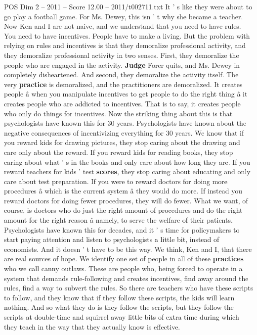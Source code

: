\begin{textsample}{POS Dim 2 – 2011 – Score 12.00 – 2011/t002711.txt}
It ' s like they were about to go play a football game.
For Ms.
Dewey, this isn ' t why she became a teacher.
Now Ken and I are not naive, and we understand that you need to have rules.
You need to have incentives.
People have to make a living.
But the problem with relying on rules and incentives is that they demoralize professional activity, and they demoralize professional activity in two senses.
First, they demoralize the people who are engaged in the activity. \textbf{Judge} Forer quits, and Ms.
Dewey in completely disheartened.
And second, they demoralize the activity itself.
The very \textbf{practice} is demoralized, and the practitioners are demoralized.
It creates people â when you manipulate incentives to get people to do the right thing â it creates people who are addicted to incentives.
That is to say, it creates people who only do things for incentives.
Now the striking thing about this is that psychologists have known this for 30 years.
Psychologists have known about the negative consequences of incentivizing everything for 30 years.
We know that if you reward kids for drawing pictures, they stop caring about the drawing and care only about the reward.
If you reward kids for reading books, they stop caring about what ' s in the books and only care about how long they are.
If you reward teachers for kids ' test \textbf{scores}, they stop caring about educating and only care about test preparation.
If you were to reward doctors for doing more procedures â which is the current system â they would do more.
If instead you reward doctors for doing fewer procedures, they will do fewer.
What we want, of course, is doctors who do just the right amount of procedures and do the right amount for the right reason â namely, to serve the welfare of their patients.
Psychologists have known this for decades, and it ' s time for policymakers to start paying attention and listen to psychologists a little bit, instead of economists.
And it doesn ' t have to be this way.
We think, Ken and I, that there are real sources of hope.
We identify one set of people in all of these \textbf{practices} who we call canny outlaws.
These are people who, being forced to operate in a system that demands rule-following and creates incentives, find away around the rules, find a way to subvert the rules.
So there are teachers who have these scripts to follow, and they know that if they follow these scripts, the kids will learn nothing.
And so what they do is they follow the scripts, but they follow the scripts at double-time and squirrel away little bits of extra time during which they teach in the way that they actually know is effective.

\end{textsample}
